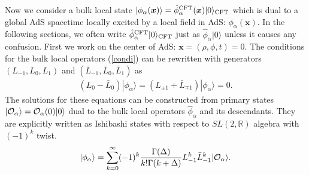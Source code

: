 \documentclass[11pt,a4paper]{article}
\def\a{{\alpha}}
\def\CO{{\cal O}}
\def\ba{\begin{eqnarray}}
\def\ea{\end{eqnarray}}
\def\f {\frac}
\def\lb{\rangle}
\def\z{\bar{z}}
\begin{document}
Now we consider a bulk local state $|\phi_\a(\boldsymbol{x})\lb=\hat{\phi}^{\rm CFT}_\a(\boldsymbol{x})|0\lb_{\rm CFT}$ which is dual to a global AdS spacetime locally excited by a local field in AdS: $\phi_\a(\boldsymbol{x})$. In the following sections, we often write $\hat{\phi}^{\rm CFT}_{\a}|0\lb_{\rm CFT}$ just as $\hat{\phi}_{\a}|0\lb$ unless it causes any confusion. First we work on the center of AdS: $\boldsymbol{x}=(\rho,\phi,t)=0$.
The conditions for the bulk local operators (\ref{condi}) can be rewritten with generators $(L_{-1},L_{0},L_{1})$ and $(\bar{L}_{-1},\bar{L}_{0},\bar{L}_{1})$ as
\ba
(L_0-\bar{L}_0)|\phi_\a\lb=(L_{\pm 1}+\bar{L}_{\mp 1})|\phi_\a\lb=0 .\label{Ishibshii}
\ea
The solutions for these equations can be constructed from primary states $|\CO_\a\lb=\CO_\a(0)|0\lb$ dual to the bulk local operators $\hat{\phi}_{\a}$ and its descendants. %
They are explicitly written as Ishibashi states with respect to $SL(2,\mathbb{R})$ algebra with $(-1)^{k}$ twist.
\ba
|\phi_\a\lb=\sum_{k=0}^{\infty}(-1)^k\f{\Gamma(\Delta)}{k!\Gamma(k+\Delta)}%
L_{-1}^{k}\bar{L}_{-1}^{k}|\CO_{\a}\lb.\label{Ishibashi}
\ea
\end{document}

